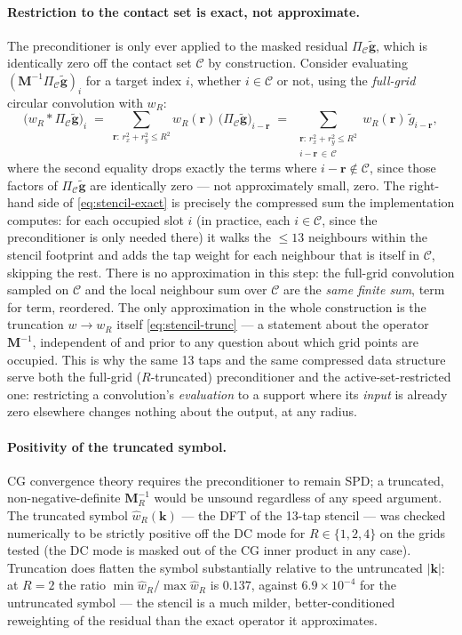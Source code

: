 \documentclass[11pt,a4paper]{article}
\newcommand{\bM}{\mathbf{M}}
\newcommand{\calC}{\mathcal{C}}
\begin{document}
\paragraph{Restriction to the contact set is exact, not approximate.}
The preconditioner is only ever applied to the masked residual $\Pi_\calC
\tilde{\mathbf g}$, which is identically zero off the contact set $\calC$ by
construction. Consider evaluating $(\bM^{-1}\Pi_\calC\tilde{\mathbf g})_i$ for
a target index $i$, whether $i \in \calC$ or not, using the \emph{full-grid}
circular convolution with $w_R$:
\begin{equation}
  \bigl(w_R * \Pi_\calC \tilde{\mathbf g}\bigr)_i
  \;=\; \sum_{\mathbf r:\,r_x^2+r_y^2 \le R^2} w_R(\mathbf r)\,
        \bigl(\Pi_\calC\tilde{\mathbf g}\bigr)_{i - \mathbf r}
  \;=\; \sum_{\substack{\mathbf r:\,r_x^2+r_y^2 \le R^2 \\ i-\mathbf r
        \,\in\, \calC}} w_R(\mathbf r)\, \tilde g_{i-\mathbf r},
  \label{eq:stencil-exact}
\end{equation}
where the second equality drops exactly the terms where $i - \mathbf r
\notin \calC$, since those factors of $\Pi_\calC \tilde{\mathbf g}$ are
identically zero — not approximately small, zero. The right-hand side of
\eqref{eq:stencil-exact} is precisely the compressed sum the implementation
computes: for each occupied slot $i$ (in practice, each $i \in \calC$, since
the preconditioner is only needed there) it walks the $\le 13$ neighbours
within the stencil footprint and adds the tap weight for each neighbour that
is itself in $\calC$, skipping the rest. There is no approximation in this
step: the full-grid convolution sampled on $\calC$ and the local neighbour
sum over $\calC$ are the \emph{same finite sum}, term for term, reordered.
The only approximation in the whole construction is the truncation
$w \to w_R$ itself \eqref{eq:stencil-trunc} — a statement about the operator
$\bM^{-1}$, independent of and prior to any question about which grid points
are occupied. This is why the same 13 taps and the same compressed
data structure serve both the full-grid ($R$-truncated) preconditioner and
the active-set-restricted one: restricting a convolution's \emph{evaluation}
to a support where its \emph{input} is already zero elsewhere changes nothing
about the output, at any radius.

\paragraph{Positivity of the truncated symbol.}
CG convergence theory requires the preconditioner to remain SPD; a truncated,
non-negative-definite $\bM^{-1}_R$ would be unsound regardless of any speed
argument. The truncated symbol $\widehat w_R(\mathbf k)$ — the DFT of the
13-tap stencil — was checked numerically to be strictly positive off the DC
mode for $R \in \{1, 2, 4\}$ on the grids tested (the DC mode is masked
out of the CG inner product in any case). Truncation does flatten the
symbol substantially relative to the untruncated $|\mathbf k|$: at $R=2$ the
ratio $\min\widehat w_R/\max\widehat w_R$ is $0.137$, against
$6.9\times10^{-4}$ for the untruncated symbol — the stencil is a much milder,
better-conditioned reweighting of the residual than the exact operator it
approximates.
\end{document}
